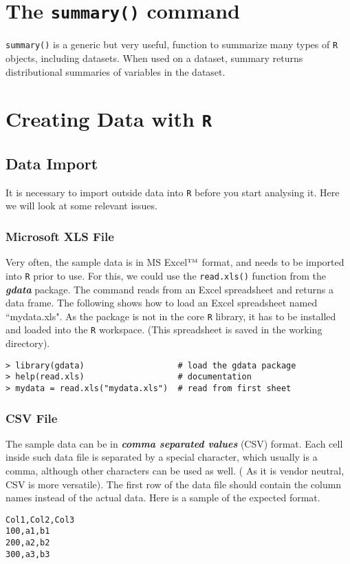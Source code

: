 \documentclass[a4paper,12pt]{article}
\begin{document}


\newpage



\section{The \texttt{summary()} command}
\texttt{summary()} is a generic but very useful, function to summarize many types of \texttt{R} objects, including datasets. When used on a dataset, summary returns distributional summaries of variables in the dataset.

\section{Creating Data with \texttt{R}}

\subsection{Data Import}
It is necessary to import outside data into \texttt{R} before you start analysing it. Here we will look at some relevant issues.

\subsubsection{Microsoft XLS File}
Very often, the sample data is in MS Excel$^{\mbox{\tiny{TM}}}$ format, and needs to be imported into \texttt{R} prior to use. For this, we could use the \texttt{read.xls()} function from the \textbf{\textit{gdata}} package. The command reads from an Excel spreadsheet and returns a data frame. The following shows how to load an Excel spreadsheet named ``mydata.xls". As the package is not in the core \texttt{R} library, it has to be installed and loaded into the \texttt{R} workspace. (This spreadsheet is saved in the working directory).
\begin{verbatim}
> library(gdata)                   # load the gdata package
> help(read.xls)                   # documentation
> mydata = read.xls("mydata.xls")  # read from first sheet
\end{verbatim}


\subsubsection{CSV File}
The sample data can be in \textit{\textbf{comma separated values}} (CSV) format. Each cell inside such data file is separated by a special character, which usually is a comma, although other characters can be used as well. ( As it is vendor neutral, CSV is more versatile).
The first row of the data file should contain the column names instead of the actual data. Here is a sample of the expected format.
\begin{verbatim}
Col1,Col2,Col3
100,a1,b1
200,a2,b2
300,a3,b3
\end{verbatim}
\end{document}
